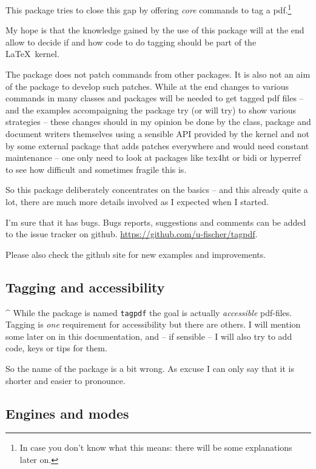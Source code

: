 \documentclass[DIV=12,parskip=half-,bibliography=totoc]{scrartcl}
\begin{document}
\TagP This package tries to close this gap by offering \emph{core} commands to tag a pdf.\footnote{In case you don't know what this means: there will be some explanations later on.}

\TagP My hope is that the knowledge gained by the use of this package will at the end allow to decide if and how code to do tagging should be part of the \LaTeX\ kernel.

\TagP The package does not patch commands from other packages. It is also not an aim of the package to develop such patches. While at the end changes to various commands in many classes and packages will be needed to get tagged pdf files -- and the examples accompaigning the package try (or will try) to show various strategies -- these changes should in my opinion be done by the class, package and document writers themselves using a sensible API provided by the kernel and not by some external package that adds patches everywhere and would need constant maintenance -- one only need to look at packages like tex4ht or bidi or hyperref to see how difficult and sometimes fragile this is.

\TagP So this package deliberately concentrates on the basics -- and this already quite a lot, there are much more details involved as I expected when I started.

\TagP I'm sure that it has bugs. Bugs reports, suggestions and comments can be added to the issue tracker on github. \url{https://github.com/u-fischer/tagpdf}.

\TagP Please also check the github site for new examples and improvements.
\TagPend

\subsection{Tagging and accessibility}

\TagP^ While the package is named \texttt{tagpdf} the goal is actually \emph{accessible} pdf-files. Tagging is \emph{one} requirement for accessibility but there are others. I will mention some later on in this documentation, and -- if sensible -- I will also try to add code, keys or tips for them.

\TagP So the name of the package is a bit wrong. As excuse I can only say that it is shorter and easier to pronounce.
\TagPend

\subsection{Engines and modes}
\end{document}
